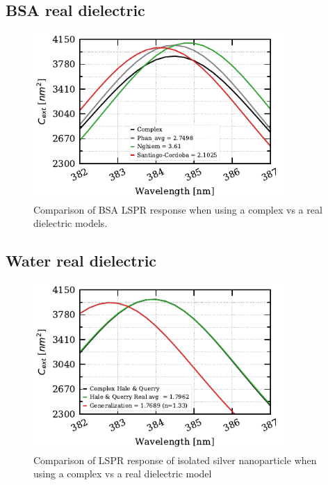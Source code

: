 \subsection{BSA real dielectric}

\begin{figure} %
    \centering
    \includegraphics[width=0.85\textwidth]{bsa_diel_study.pdf} 
    \caption{Comparison of BSA LSPR response when using a complex vs a real dielectric models.}
    \label{fig:bsa_diel}
 \end{figure}

\subsection{Water real dielectric}

\begin{figure} %
    \centering
    \includegraphics[width=0.85\textwidth]{iso_np_water_diel_study.pdf} 
    \caption{Comparison of LSPR response of isolated silver nanoparticle when using a complex 
     vs a real dielectric model}
    \label{fig:iso_NP_diel}
 \end{figure}

